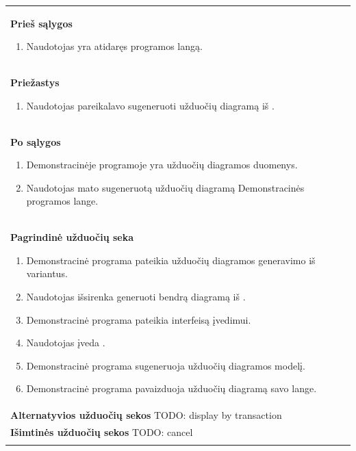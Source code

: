 \begin{center}
\begin{longtable}{|p{\textwidth}|}
    \\
    \textbf{Prieš sąlygos}
    \begin{enumerate}
    	\item Naudotojas yra atidaręs programos langą.
	\end{enumerate}
    \\
    \textbf{Priežastys}
    \begin{enumerate}
    	\item Naudotojas pareikalavo sugeneruoti užduočių diagramą iš \DVCM{}.
	\end{enumerate}
    \\
    \textbf{Po sąlygos}
    \begin{enumerate}
    	\item Demonstracinėje programoje yra užduočių diagramos duomenys.
      \item Naudotojas mato sugeneruotą užduočių diagramą Demonstracinės programos lange.
	\end{enumerate}
    \\
    \textbf{Pagrindinė užduočių seka}
    \begin{enumerate}
      \item Demonstracinė programa pateikia užduočių diagramos generavimo iš \DVCM{} variantus.
      \item Naudotojas išsirenka generuoti bendrą diagramą iš \DVCM{}.
    	\item Demonstracinė programa pateikia interfeisą \DVCM{} įvedimui.
    	\item Naudotojas įveda \DVCM{}.
      \item Demonstracinė programa sugeneruoja užduočių diagramos modelį.
      \item Demonstracinė programa pavaizduoja užduočių diagramą savo lange.
	\end{enumerate}
    \\
    \textbf{Alternatyvios užduočių sekos}
      TODO: display by transaction
    \\
    \textbf{Išimtinės užduočių sekos}
      TODO: cancel
    \\
    \\ \hline
    \end{longtable}
\end{center}
